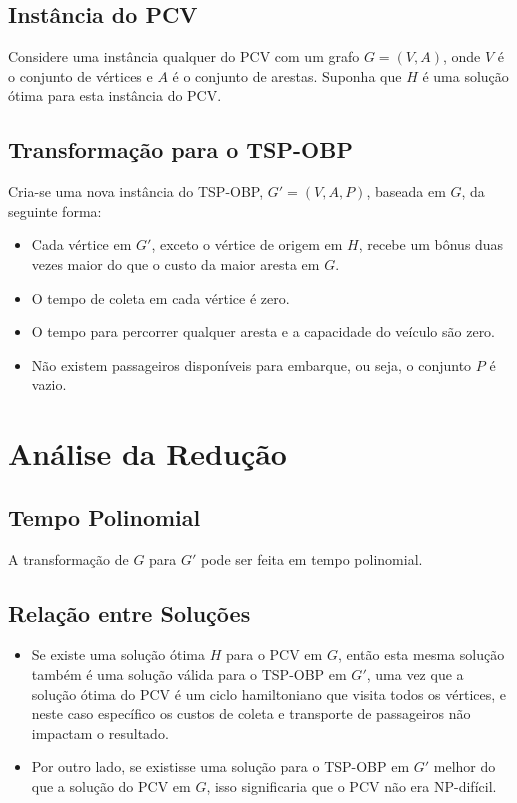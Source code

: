 \documentclass[12pt, a4paper]{report}
\begin{document}
\subsection{Instância do PCV}

Considere uma instância qualquer do PCV com um grafo \(G = (V, A)\), onde \(V\) é o conjunto de vértices e \(A\) é o conjunto de arestas. Suponha que \(H\) é uma solução ótima para esta instância do PCV.

\subsection{Transformação para o TSP-OBP}

Cria-se uma nova instância do TSP-OBP, \(G' = (V, A, P)\), baseada em \(G\), da seguinte forma:

\begin{itemize}
    \item Cada vértice em \(G'\), exceto o vértice de origem em \(H\), recebe um bônus duas vezes maior do que o custo da maior aresta em \(G\).
    \item O tempo de coleta em cada vértice é zero.
    \item O tempo para percorrer qualquer aresta e a capacidade do veículo são zero.
    \item Não existem passageiros disponíveis para embarque, ou seja, o conjunto \(P\) é vazio.
\end{itemize}

\section{Análise da Redução}

\subsection{Tempo Polinomial}

A transformação de \(G\) para \(G'\) pode ser feita em tempo polinomial.

\subsection{Relação entre Soluções}

\begin{itemize}
    \item Se existe uma solução ótima \(H\) para o PCV em \(G\), então esta mesma solução também é uma solução válida para o TSP-OBP em \(G'\), uma vez que a solução ótima do PCV é um ciclo hamiltoniano que visita todos os vértices, e neste caso específico os custos de coleta e transporte de passageiros não impactam o resultado.
    \item Por outro lado, se existisse uma solução para o TSP-OBP em \(G'\) melhor do que a solução do PCV em \(G\), isso significaria que o PCV não era NP-difícil.
\end{itemize}
\end{document}
